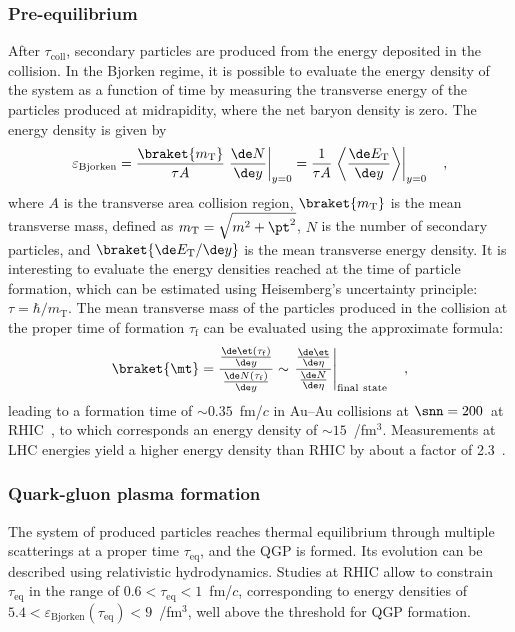 \subsubsection{Pre-equilibrium}
After $\tau_\mathrm{coll}$, secondary particles are produced from the energy deposited in the collision. In the Bjorken regime, it is possible to evaluate the energy density of the system as a function of time by measuring the transverse energy of the particles produced at midrapidity, where the net baryon density is zero. The energy density is given by
\begin{equation*}
    \varepsilon_\mathrm{Bjorken} = \frac{\braket{m_\mathrm{T}}}{\tau A} \left. \frac{\de N}{\de y}\right\rvert_{y=0} = \frac{1}{\tau A}\left. \left\langle\frac{\de E_\mathrm{T}}{\de y}\right\rangle\right\rvert_{y=0} \quad ,
\end{equation*}
where $A$ is the transverse area collision region, $\braket{m_\mathrm{T}}$ is the mean transverse mass, defined as $m_\mathrm{T} = \sqrt{m^2 + \pt^2}$, $N$ is the number of secondary particles, and $\braket{\de E_\mathrm{T}/\de y}$ is the mean transverse energy density. It is interesting to evaluate the energy densities reached at the time of particle formation, which can be estimated using Heisemberg's uncertainty principle: $\tau = \hbar/m_\mathrm{T}$. The mean transverse mass of the particles produced in the collision at the proper time of formation $\tau_\mathrm{f}$ can be evaluated using the approximate formula:
\begin{equation*}
    \braket{\mt} = \frac{\frac{\de \et(\tau_\mathrm{f})}{\de y}}{\frac{\de N(\tau_\mathrm{f})}{\de y}}\sim \left. \frac{\frac{\de \et}{\de \eta}}{\frac{\de N}{\de \eta}}\right\rvert_\mathrm{final~state}\quad ,
\end{equation*}
leading to a formation time of $\sim 0.35$~fm/$c$ in Au--Au collisions at $\snn=200$~\gevc at RHIC~\cite{PHENIX:2004vcz}, to which corresponds an energy density of $\sim 15$~\gev/fm$^3$. Measurements at LHC energies yield a higher energy density than RHIC by about a factor of 2.3~\cite{ALICE:2016igk}.

\subsubsection{Quark-gluon plasma formation}
The system of produced particles reaches thermal equilibrium through multiple scatterings at a proper time $\tau_\mathrm{eq}$, and the QGP is formed. Its evolution can be described using relativistic hydrodynamics. Studies at RHIC allow to constrain $\tau_\mathrm{eq}$ in the range of $0.6<\tau_\mathrm{eq}<1$~fm/$c$, corresponding to energy densities of $5.4 < \varepsilon_\mathrm{Bjorken}(\tau_\mathrm{eq})< 9$~\gev/fm$^3$, well above the threshold for QGP formation.
